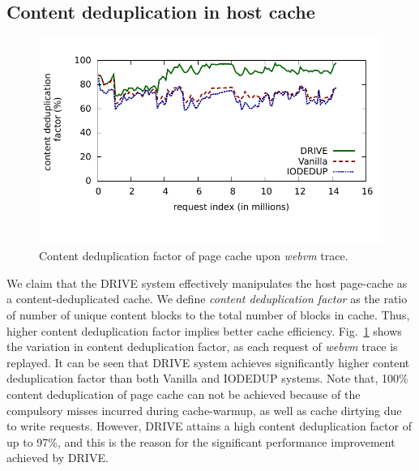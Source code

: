 \subsection{Content deduplication in host cache}
\begin{figure}[]
\centering
\includegraphics[scale=1]{confided-figures/contentdedup-factor/contentdedupfactor.pdf}
\vspace{-0.4in}
\caption{Content deduplication factor of page cache upon \textit{webvm} trace.}
\label{fig:contentdedup-factor-timeseries}
\end{figure}

We claim that the DRIVE system 
effectively manipulates the host page-cache as a content-deduplicated
cache. We define 
\textit{content deduplication factor} as the ratio of number of unique
content blocks to the total number of blocks in cache. Thus, higher
content deduplication factor implies better cache efficiency.
Fig.~\ref{fig:contentdedup-factor-timeseries} shows the variation in
content deduplication factor, as each request of \textit{webvm}
trace is replayed. It can be seen that DRIVE system achieves
significantly higher content deduplication factor than both 
Vanilla and IODEDUP systems. Note that, 100\% content deduplication 
of page cache can not be achieved because of the compulsory misses
incurred during cache-warmup, as well as cache dirtying due to 
write requests. However, DRIVE attains a high 
content deduplication factor of up to 97\%, and this is the reason for 
the significant performance improvement achieved by DRIVE.


